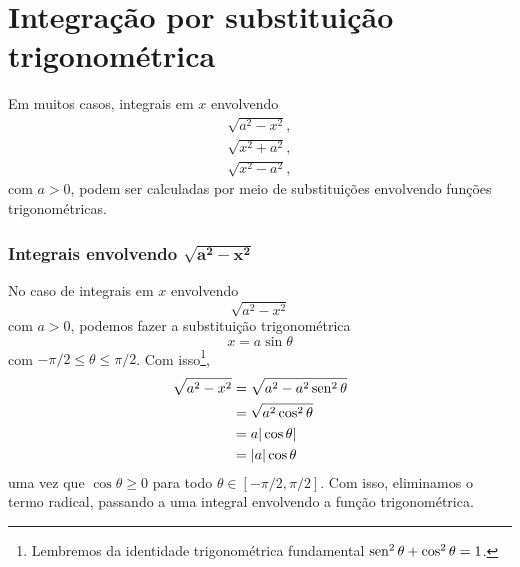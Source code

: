 \section{Integração por substituição trigonométrica}\label{cap_int_sec_substrigo}

Em muitos casos, integrais em $x$ envolvendo
\begin{gather}
  \sqrt{a^2 - x^2},\\
  \sqrt{x^2 + a^2},\\
  \sqrt{x^2 - a^2},
\end{gather}
com $a>0$, podem ser calculadas por meio de substituições envolvendo funções trigonométricas.

\subsubsection{Integrais envolvendo $\pmb{\sqrt{a^2 - x^2}}$}

No caso de integrais em $x$ envolvendo
\begin{equation}
  \sqrt{a^2 - x^2}
\end{equation}
com $a>0$, podemos fazer a substituição trigonométrica
\begin{equation}
  x = a\sin\theta
\end{equation}
com $-\pi/2\leq\theta\leq\pi/2$. Com isso\footnote{Lembremos da identidade trigonométrica fundamental  $\operatorname{sen}^2 \theta + \cos^2 \theta = 1 $.},
\begin{align}
  \sqrt{a^2 - x^2} &= \sqrt{a^2 - a^2\operatorname{sen}^2\theta}\\
                   &= \sqrt{a^2\cos^2\theta}\\
                   &= a|\cos\theta|\\
                   &= |a|\cos\theta
\end{align}
uma vez que $\cos\theta \geq 0$ para todo $\theta\in [-\pi/2,\pi/2]$. Com isso, eliminamos o termo radical, passando a uma integral envolvendo a função trigonométrica.

